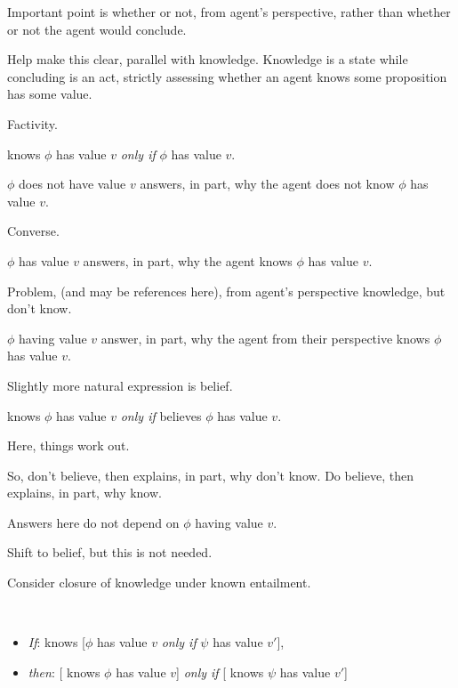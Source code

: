 \begin{note}
  Important point is whether or not, from agent's perspective, rather than whether or not the agent would conclude.

  Help make this clear, parallel with knowledge.
  Knowledge is a state while concluding is an act, strictly assessing whether an agent knows some proposition has some value.

  Factivity.

  \begin{principle}
    \label{principle:factivity}
    \vAgent{} knows \(\phi\) has value \(v\) \emph{only if} \(\phi\) has value \(v\).
  \end{principle}

  \(\phi\) does not have value \(v\) answers, in part, why the agent does not know \(\phi\) has value \(v\).

  Converse.

  \(\phi\) has value \(v\) answers, in part, why the agent knows \(\phi\) has value \(v\).

  Problem, (and may be references here), from agent's perspective knowledge, but don't know.

  \(\phi\) having value \(v\) answer, in part, why the agent from their perspective knows \(\phi\) has value \(v\).

  Slightly more natural expression is belief.

  \begin{principle}
    \label{principle:k-belief}
    \vAgent{} knows \(\phi\) has value \(v\) \emph{only if} \vAgent{} believes \(\phi\) has value \(v\).
  \end{principle}

  Here, things work out.

  So, don't believe, then explains, in part, why don't know.
  Do believe, then explains, in part, why know.

  Answers here do not depend on \(\phi\) having value \(v\).

  Shift to belief, but this is not needed.

  Consider closure of knowledge under known entailment.

  \begin{principle}[Closure]\mbox{ }\vspace{-\baselineskip}
    \label{principle:closure}
    \begin{itemize}[noitemsep]
    \item[]
      \emph{If}:
        \vAgent{} knows [\(\phi\) has value \(v\) \emph{only if} \(\psi\) has value \(v'\)],
    \item[]
      \emph{then}:
        [\vAgent{} knows \(\phi\) has value \(v\)] \emph{only if} [\vAgent{} knows \(\psi\) has value \(v'\)]
    \end{itemize}
  \end{principle}


\end{note}

